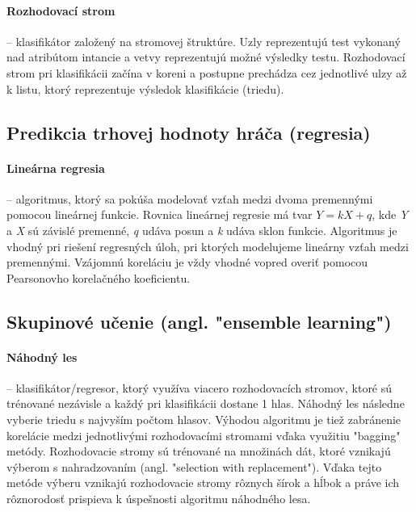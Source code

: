 \documentclass[runningheads]{llncs}
\begin{document}
\paragraph{Rozhodovací strom} --
klasifikátor založený na stromovej štruktúre. Uzly reprezentujú test vykonaný nad atribútom intancie a vetvy reprezentujú možné výsledky testu. Rozhodovací strom pri klasifikácii začína v koreni a postupne prechádza cez jednotlivé ulzy až k listu, ktorý reprezentuje výsledok klasifikácie (triedu). 

\subsection{Predikcia trhovej hodnoty hráča (regresia)}

\paragraph{Lineárna regresia} --
algoritmus, ktorý sa pokúša modelovať vzťah medzi dvoma premennými pomocou lineárnej funkcie. Rovnica lineárnej regresie má tvar $Y = kX + q$, kde \textit{Y} a \textit{X} sú závislé premenné, \textit{q} udáva posun a \textit{k} udáva sklon funkcie. Algoritmus je vhodný pri riešení regresných úloh, pri ktorých modelujeme lineárny vzťah medzi premennými. Vzájomnú koreláciu je vždy vhodné vopred overiť pomocou Pearsonovho korelačného koeficientu. 

\subsection{Skupinové učenie (angl. "ensemble learning")}

\paragraph{Náhodný les} --
klasifikátor/regresor, ktorý využíva viacero rozhodovacích stromov, ktoré sú trénované nezávisle a každý pri klasifikácii dostane 1 hlas. Náhodný les následne vyberie triedu s najvyším počtom hlasov. Výhodou algoritmu je tiež zabránenie korelácie medzi jednotlivými rozhodovacími stromami vďaka využitiu "bagging" metódy. Rozhodovacie stromy sú trénované na množinách dát, ktoré vznikajú výberom s nahradzovaním (angl. "selection with replacement"). Vďaka tejto metóde výberu vznikajú rozhodovacie stromy rôznych šírok a hĺbok a práve ich rôznorodosť prispieva k úspešnosti algoritmu náhodného lesa.
\end{document}

